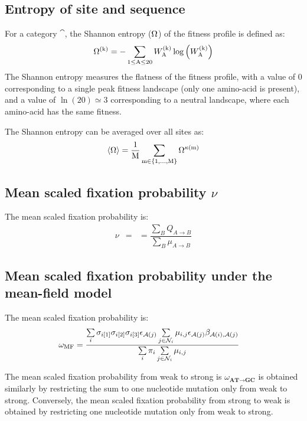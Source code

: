 \subsection{Entropy of site and sequence}
\label{subsec:entropy}

For a category $\cat$, the Shannon entropy (${\Omega}$) of the fitness profile is defined as:
\begin{equation}
    {\Omega}^{(\text{k})} = - \sum\limits_{1 \leq \text{A} \leq 20} W^{(\text{k})}_{\text{A}} \log \left( W^{(\text{k})}_{\text{A}} \right)
\end{equation}
The Shannon entropy measures the flatness of the fitness profile, with a value of $0$ corresponding to a single peak fitness landscape (only one amino-acid is present), and a value of $\ln(20)\simeq3$ corresponding to a \gls{neutral} landscape, where each amino-acid has the same fitness.

The Shannon entropy can be averaged over all sites as:
\begin{equation}
    \langle {\Omega} \rangle = \dfrac{1}{\text{M}}\sum\limits_{\text{m} \in \{1, \hdots, \text{M}\}} {\Omega}^{\kappa\left(\text{m}\right)}
\end{equation}

\subsection{Mean scaled fixation probability \texorpdfstring{$\nu$}{ν}}
\label{subsec:fixation-bias}
The mean scaled fixation probability is:
\begin{align}
    \nu & = & = \dfrac{ \sum\limits_{B} Q_{A \to B}}{ \sum\limits_{B} \mu_{A \to B}}
\end{align}


\subsection{Mean scaled fixation probability under the mean-field model}
\label{sec-mut-bias:mean-field-omega}

The mean scaled fixation probability is:
\begin{align}
    \omega_{\text{MF}} & = \dfrac{ \sum\limits_{i} \sigma_{{i}[1]}\sigma_{{i}[2]}\sigma_{{i}[3]} \epsilon_{\mathcal{A}({j})} \sum\limits_{j \in \mathcal{N}_{{i}}} \mu_{{i}, {j}} \epsilon_{\mathcal{A}({j})} \beta_{\mathcal{A}({i}), \mathcal{A}({j})} }{\sum\limits_{i} \pi_{i} \sum\limits_{j \in \mathcal{N}_{{i}} } \mu_{{i}, {j}}}
\end{align}

The mean scaled fixation probability from weak to strong is $\omega_{\textbf{AT} \rightarrow \textbf{GC}}$ is obtained similarly by restricting the sum to one nucleotide mutation only from weak to strong.
Conversely, the mean scaled fixation probability from strong to weak is obtained by restricting one nucleotide mutation only from weak to strong.

